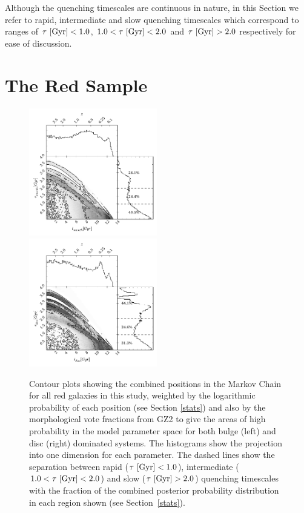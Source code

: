 Although the quenching timescales are continuous in nature, in this Section we refer to rapid, intermediate and slow quenching timescales which correspond to ranges of  $\tau ~\rm{[Gyr]} < 1.0$, $1.0 < \tau ~\rm{[Gyr]} < 2.0$ and $\tau ~\rm{[Gyr]} > 2.0$ respectively for ease of discussion.



\section{The Red Sample}\label{rs}

\begin{figure}
\includegraphics[width=0.4975\textwidth]{morphology/red_smooth.pdf}
\includegraphics[width=0.4975\textwidth]{morphology/red_disc.pdf}
\caption[Population densities of red smooth and disc galaxies]{Contour plots showing the combined positions in the Markov Chain for all red galaxies in this study, weighted by the logarithmic probability of each position (see Section \ref{stats}) and also by the morphological vote fractions from GZ2 to give the areas of high probability in the model parameter space for both bulge (left) and disc (right) dominated systems. The histograms show the projection into one dimension for each parameter. The dashed lines show the separation between rapid ($\tau ~\rm{[Gyr]} < 1.0$), intermediate ($1.0 < \tau ~\rm{[Gyr]} < 2.0$) and slow ($\tau ~\rm{[Gyr]} > 2.0$) quenching timescales with the fraction of the combined posterior probability distribution in each region shown (see Section~\ref{stats}).}
\label{red_s}
\end{figure}

